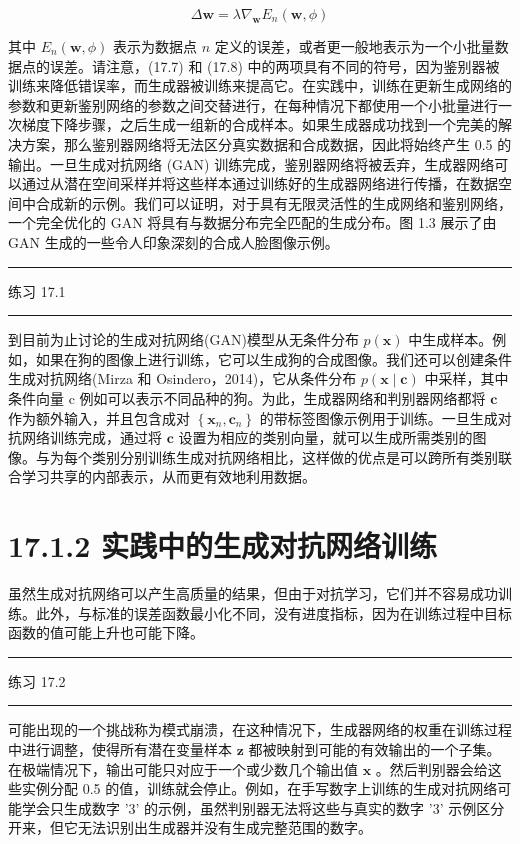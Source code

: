 \documentclass[10pt]{article}
\newcommand{\HRule}{\begin{center}\rule{0.9\linewidth}{0.2mm}\end{center}}
\begin{document}
\[
\Delta \mathbf{w} = \lambda {\nabla }_{\mathbf{w}}{E}_{n}\left( {\mathbf{w},\phi }\right)  \tag{17.8}
\]

其中 \({E}_{n}\left( {\mathbf{w},\phi }\right)\) 表示为数据点 \(n\) 定义的误差，或者更一般地表示为一个小批量数据点的误差。请注意，(17.7) 和 (17.8) 中的两项具有不同的符号，因为鉴别器被训练来降低错误率，而生成器被训练来提高它。在实践中，训练在更新生成网络的参数和更新鉴别网络的参数之间交替进行，在每种情况下都使用一个小批量进行一次梯度下降步骤，之后生成一组新的合成样本。如果生成器成功找到一个完美的解决方案，那么鉴别器网络将无法区分真实数据和合成数据，因此将始终产生 0.5 的输出。一旦生成对抗网络 (GAN) 训练完成，鉴别器网络将被丢弃，生成器网络可以通过从潜在空间采样并将这些样本通过训练好的生成器网络进行传播，在数据空间中合成新的示例。我们可以证明，对于具有无限灵活性的生成网络和鉴别网络，一个完全优化的 GAN 将具有与数据分布完全匹配的生成分布。图 1.3 展示了由 GAN 生成的一些令人印象深刻的合成人脸图像示例。

\HRule

练习 17.1

\HRule

到目前为止讨论的生成对抗网络(GAN)模型从无条件分布 \(p\left( \mathbf{x}\right)\) 中生成样本。例如，如果在狗的图像上进行训练，它可以生成狗的合成图像。我们还可以创建条件生成对抗网络(Mirza 和 Osindero，2014)，它从条件分布 \(p\left( {\mathbf{x} \mid  \mathbf{c}}\right)\) 中采样，其中条件向量 c 例如可以表示不同品种的狗。为此，生成器网络和判别器网络都将 \(\mathbf{c}\) 作为额外输入，并且包含成对 \(\left\{  {{\mathbf{x}}_{n},{\mathbf{c}}_{n}}\right\}\) 的带标签图像示例用于训练。一旦生成对抗网络训练完成，通过将 \(\mathbf{c}\) 设置为相应的类别向量，就可以生成所需类别的图像。与为每个类别分别训练生成对抗网络相比，这样做的优点是可以跨所有类别联合学习共享的内部表示，从而更有效地利用数据。

\section*{17.1.2 实践中的生成对抗网络训练}

虽然生成对抗网络可以产生高质量的结果，但由于对抗学习，它们并不容易成功训练。此外，与标准的误差函数最小化不同，没有进度指标，因为在训练过程中目标函数的值可能上升也可能下降。

\HRule

练习 17.2

\HRule

可能出现的一个挑战称为模式崩溃，在这种情况下，生成器网络的权重在训练过程中进行调整，使得所有潜在变量样本 \(\mathbf{z}\) 都被映射到可能的有效输出的一个子集。在极端情况下，输出可能只对应于一个或少数几个输出值 \(\mathbf{x}\) 。然后判别器会给这些实例分配 0.5 的值，训练就会停止。例如，在手写数字上训练的生成对抗网络可能学会只生成数字 '3' 的示例，虽然判别器无法将这些与真实的数字 '3' 示例区分开来，但它无法识别出生成器并没有生成完整范围的数字。
\end{document}
